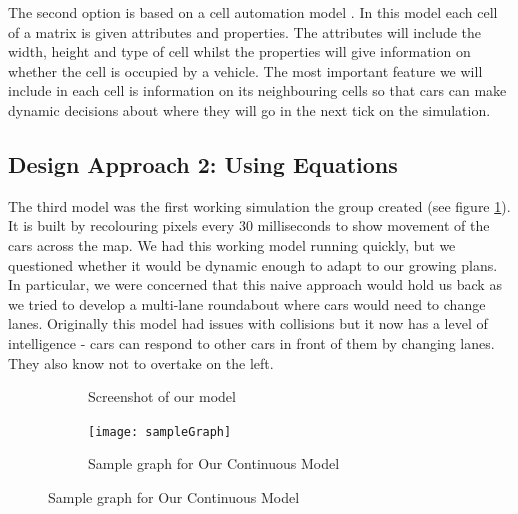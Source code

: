\documentclass[11pt]{article}
\begin{document}
	
	The second option is based on a cell automation model \cite{namekawa2005general}. In this model each cell of a matrix is given attributes and properties. The attributes will include the width, height and type of cell whilst the properties will give information on whether the cell is occupied by a vehicle. The most important feature we will include in each cell is information on its neighbouring cells so that cars can make dynamic decisions about where they will go in the next tick on the simulation.
	
	
	\subsection{Design Approach 2: Using Equations}
	\FloatBarrier
	
	
    The third model was the first working simulation the group created (see figure \ref{NurScreenshot}). It is built by recolouring pixels every 30 milliseconds to show movement of the cars across the map. We had this working model running quickly, but we questioned whether it would be dynamic enough to adapt to our growing plans. In particular, we were concerned that this naive approach would hold us back as we tried to develop a multi-lane roundabout where cars would need to change lanes. Originally this model had issues with collisions but it now has a level of intelligence - cars can respond to other cars in front of them by changing lanes. They also know not to overtake on the left. 	
\begin{figure}
	
	\centering
	\begin{subfigure}{.35\textwidth}
		\centering
		\caption{Screenshot of  our model }
		\label{NurScreenshot}
	\end{subfigure}
	\begin{subfigure}{.35\textwidth}
		\centering
		\texttt{[image: sampleGraph]}
		\caption{Sample graph for Our Continuous Model}
		\label{KimModel}
	\end{subfigure}
\end{figure}	
%		
\end{document}

